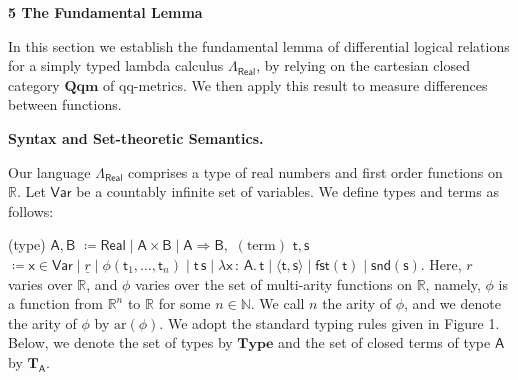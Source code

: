  
 
 


 
\par\medskip\noindent\textbf{5 The Fundamental Lemma}\par
 
 
In this section we establish the fundamental lemma of differential logical relations for a simply typed lambda calculus $\Lambda_{\mathsf{Real}}$, by relying on the cartesian closed category $\mathbf{Qqm}$ of qq-metrics. We then apply this result to measure differences between functions.\par
 
 
 
\par\medskip\noindent\textbf{Syntax and Set-theoretic Semantics.}\par
 
 
Our language $\Lambda_{\mathsf{Real}}$ comprises a type of real numbers and first order functions on $\mathbb{R}$. Let $\mathsf{Var}$ be a countably infinite set of variables. We define types and terms as follows:\par
    (type) $\displaystyle\mathsf{A},\mathsf{B}$ $\displaystyle\coloneq\mathsf{Real}\mid\mathsf{A}\times\mathsf{B}\mid\mathsf{A}%
\Rightarrow\mathsf{B},$     $\displaystyle(\text{term})$ $\displaystyle\mathsf{t},\mathsf{s}$ $\displaystyle\coloneq\mathsf{x}\in\mathsf{Var}\mid\underline{r}\mid\phi(%
\mathsf{t}_{1},\ldots,\mathsf{t}_{n})\mid\mathsf{t}\,\mathsf{s}\mid\lambda%
\mathsf{x}\,{:}\,\mathsf{A}.\,\mathsf{t}\mid\langle\mathsf{t},\mathsf{s}%
\rangle\mid\mathsf{fst}(\mathsf{t})\mid\mathsf{snd}(\mathsf{s}).$    
Here, $r$ varies over $\mathbb{R}$, and $\phi$ varies over the set of multi-arity functions on $\mathbb{R}$, namely, $\phi$ is a function from $\mathbb{R}^{n}$ to $\mathbb{R}$ for some $n\in\mathbb{N}$. We call $n$ the arity of $\phi$, and we denote the arity of $\phi$ by $\mathrm{ar}(\phi)$. We adopt the standard typing rules given in Figure 1. Below, we denote the set of types by $\mathbf{Type}$ and the set of closed terms of type $\mathsf{A}$ by $\mathbf{T}_{\mathsf{A}}$.\par
 

